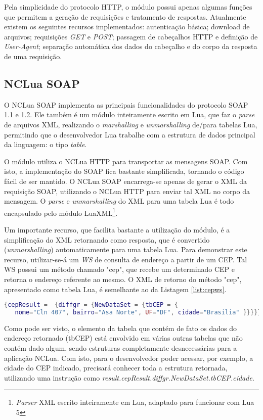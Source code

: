 Pela simplicidade do protocolo HTTP, o módulo possui apenas algumas funções que permitem a geração
de requisições e tratamento de respostas. Atualmente existem os seguintes recursos implementados: 
autenticação básica; download de arquivos;
requisições \textit{GET} e \textit{POST};
passagem de cabeçalhos HTTP e definição de \textit{User-Agent};
separação automática dos dados do cabeçalho e do corpo da resposta de uma requisição.

\subsection{NCLua SOAP} \label{sec:ncluasoap}
O NCLua SOAP implementa as principais funcionalidades do protocolo SOAP 1.1 e 1.2. 
Ele também é um módulo inteiramente
escrito em Lua, que faz o \textit{parse} de arquivos XML, 
realizando o \textit{marshalling} e \textit{unmarshalling} de/para tabelas Lua, permitindo que o desenvolvedor Lua
trabalhe com a estrutura de dados principal da linguagem: o tipo \textit{table}.

O módulo utiliza o NCLua HTTP para transportar as mensagens SOAP. Com isto, a implementação do SOAP fica bastante simplificada, tornando o código
fácil de ser mantido. O NCLua SOAP encarrega-se apenas de gerar o XML da requisição SOAP, utilizando
o NCLua HTTP para enviar tal XML no corpo da mensagem. O \textit{parse} e \textit{unmarshalling} do XML para uma tabela Lua
é todo encapsulado pelo módulo LuaXML\footnote{\textit{Parser} XML escrito inteiramente em Lua, adaptado para funcionar com Lua 5}. 

Um importante recurso, que facilita bastante a utilização do módulo, é a simplificação 
do XML retornando como resposta, que é convertido (\textit{unmarshalling}) automaticamente para uma tabela Lua.
Para demonstrar este recurso, utilizar-se-á um \textit{WS} de consulta de endereço a partir de um CEP. 
Tal WS possui um método chamado "cep",
que recebe um determinado CEP e retorna o endereço referente ao mesmo.
O XML de retorno do método "cep", apresentado como tabela Lua, é semelhante ao da Listagem \ref{list:cepws}.

\begin{lstlisting}[caption=Tabela Lua gerada a partir de um XML de resposta a uma requisição SOAP, label=list:cepws, language=lua]
{cepResult =  {diffgr = {NewDataSet = {tbCEP = {
   nome="Cln 407", bairro="Asa Norte", UF="DF", cidade="Brasilia" }}}}}
\end{lstlisting}

Como pode ser visto, o elemento
da tabela que contém de fato os dados do endereço retornado (tbCEP) está envolvido em 
várias outras tabelas que não contém dado algum, sendo estruturas completamente
desnecessárias para a aplicação NCLua. Com isto, para o desenvolvedor
poder acessar, por exemplo, a cidade do CEP indicado, precisará 
conhecer toda a estrutura retornada, utilizando uma instrução como
\textit{result.cepResult.diffgr.NewDataSet.tbCEP.cidade}.

